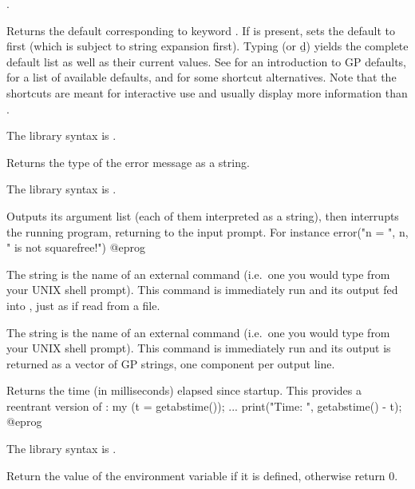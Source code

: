 .

\label{se:default}
Returns the default corresponding to keyword . If  is
present, sets the default to  first (which is subject to string
expansion first). Typing  (or \b{d}) yields the complete
default list as well as their current values. See  for an
introduction to GP defaults,  for a
list of available defaults, and  for some shortcut
alternatives. Note that the shortcuts are meant for interactive use and
usually display more information than .

The library syntax is .

\label{se:errname}
Returns the type of the error message  as a string.

The library syntax is .

\label{se:error}
Outputs its argument list (each of
them interpreted as a string), then interrupts the running  program,
returning to the input prompt. For instance
\bprog
error("n = ", n, " is not squarefree!")
@eprog\noindent

\label{se:extern}
The string  is the name of an external command (i.e.~one you
would type from your UNIX shell prompt). This command is immediately run and
its output fed into , just as if read from a file.

\label{se:externstr}
The string  is the name of an external command (i.e.~one you
would type from your UNIX shell prompt). This command is immediately run and
its output is returned as a vector of GP strings, one component per output
line.

\label{se:getabstime}
Returns the time (in milliseconds) elapsed since  startup. This
provides a reentrant version of :
\bprog
my (t = getabstime());
...
print("Time: ", getabstime() - t);
@eprog

The library syntax is .

\label{se:getenv}
Return the value of the environment variable  if it is defined, otherwise return 0.

